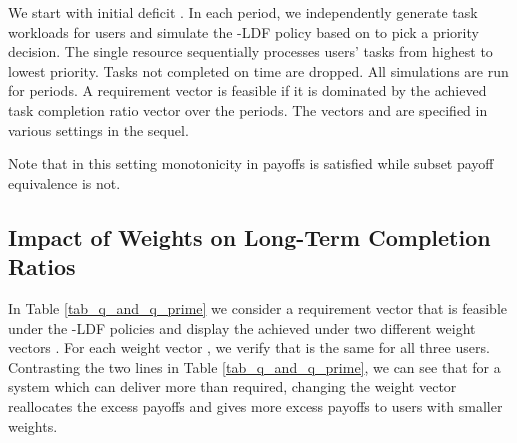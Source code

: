 \documentclass[prodmode,acmtompecs]{acmsmall}
\newcommand{\myComments}[1]{}
\newif\ifdissertation
\newcommand{\dissertationStart}{\ifdissertation  \myComments{Dissertation version: }}
\begin{document}
We start with initial deficit . In each period, we independently generate task workloads for users and simulate the -LDF policy based on  to pick a priority decision. The single resource sequentially processes users' tasks from highest to lowest priority. 
Tasks not completed on time are dropped. 
All simulations are run for  periods.  
A requirement vector  is feasible if it is dominated by the achieved task completion ratio vector  over the  periods. The vectors  and  are specified in various settings in the sequel. 

Note that in this setting monotonicity in payoffs is satisfied while subset payoff equivalence is not. 

\subsection{Impact of Weights on Long-Term Completion Ratios}
\label{subsection_effect_weights_long_term}

In Table \ref{tab_q_and_q_prime} we consider a requirement vector  that is feasible under the -LDF policies and display the achieved 
 under two different weight vectors . For each weight vector , we verify that  is the same for all three users. 
Contrasting the two lines in Table \ref{tab_q_and_q_prime}, we can see that for a system which can deliver more than required, changing the weight vector reallocates the excess payoffs and gives more excess payoffs to users with smaller weights. 

\begin{table}[h]
\normalsize
\end{table}

\dissertationStart
\end{document}
